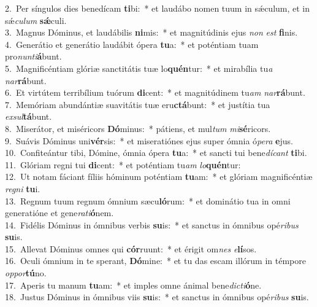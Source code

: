 {2.~}Per síngulos dies benedícam \textbf{ti}bi:~* et laudábo nomen tuum in sǽculum, et in sǽ\textit{cu}\textit{lum} \textbf{sǽ}culi.\\
{3.~}Magnus Dóminus, et laudábilis \textbf{ni}mis:~* et magnitúdinis ejus \textit{non} \textit{est} \textbf{fi}nis.\\
{4.~}Generátio et generátio laudábit ópera \textbf{tu}a:~* et poténtiam tuam pro\textit{nun}\textit{ti}\textbf{á}bunt.\\
{5.~}Magnificéntiam glóriæ sanctitátis tuæ lo\textbf{quén}tur:~* et mirabília tu\textit{a} \textit{nar}\textbf{rá}bunt.\\
{6.~}Et virtútem terribílium tuórum \textbf{di}cent:~* et magnitúdinem tu\textit{am} \textit{nar}\textbf{rá}bunt.\\
{7.~}Memóriam abundántiæ suavitátis tuæ eru\textbf{ctá}bunt:~* et justítia tua \textit{ex}\textit{sul}\textbf{tá}bunt.\\
{8.~}Miserátor, et miséricors \textbf{Dó}minus:~* pátiens, et mul\textit{tum} \textit{mi}\textbf{sé}ricors.\\
{9.~}Suávis Dóminus uni\textbf{vér}sis:~* et miseratiónes ejus super ómnia ó\textit{pe}\textit{ra} \textbf{e}jus.\\
{10.~}Confiteántur tibi, Dómine, ómnia ópera \textbf{tu}a:~* et sancti tui bene\textit{dí}\textit{cant} \textbf{ti}bi.\\
{11.~}Glóriam regni tui \textbf{di}cent:~* et poténtiam tu\textit{am} \textit{lo}\textbf{quén}tur:\\
{12.~}Ut notam fáciant fíliis hóminum poténtiam \textbf{tu}am:~* et glóriam magnificéntiæ \textit{re}\textit{gni} \textbf{tu}i.\\
{13.~}Regnum tuum regnum ómnium sæcu\textbf{ló}rum:~* et dominátio tua in omni generatióne et gene\textit{ra}\textit{ti}\textbf{ó}nem.\\
{14.~}Fidélis Dóminus in ómnibus verbis \textbf{su}is:~* et sanctus in ómnibus opé\textit{ri}\textit{bus} \textbf{su}is.\\
{15.~}Allevat Dóminus omnes qui \textbf{cór}ruunt:~* et érigit om\textit{nes} \textit{e}\textbf{lí}sos.\\
{16.~}Oculi ómnium in te sperant, \textbf{Dó}mine:~* et tu das escam illórum in témpore \textit{op}\textit{por}\textbf{tú}no.\\
{17.~}Aperis tu manum \textbf{tu}am:~* et imples omne ánimal bene\textit{di}\textit{cti}\textbf{ó}ne.\\
{18.~}Justus Dóminus in ómnibus viis \textbf{su}is:~* et sanctus in ómnibus opé\textit{ri}\textit{bus} \textbf{su}is.\\
